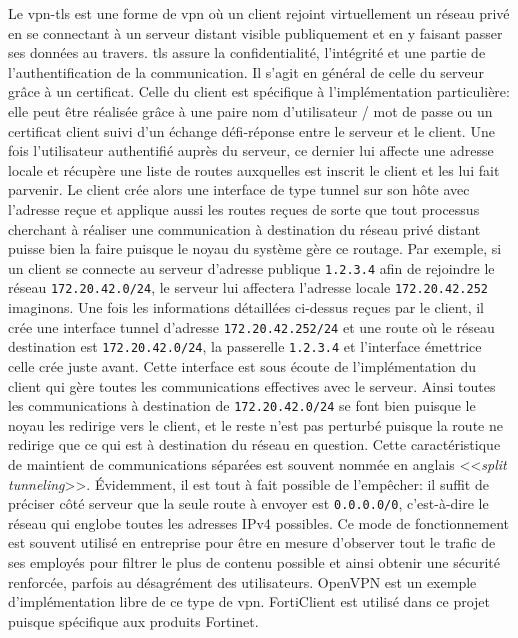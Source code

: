\documentclass[12pt, oneside, a4paper, titlepage]{report}
\begin{document}
Le \gls{vpn-tls} est une forme de \gls{vpn} où un client rejoint virtuellement
un réseau privé en se connectant à un serveur distant visible publiquement et en
y faisant passer ses données au travers. \gls{tls} assure la confidentialité,
l'intégrité et une partie de l'authentification de la communication. Il s'agit
en général de celle du serveur grâce à un certificat. Celle du client est
spécifique à l'implémentation particulière: elle peut être réalisée grâce à une
paire nom d'utilisateur / mot de passe ou un certificat client suivi d'un
échange défi-réponse entre le serveur et le client. Une fois l'utilisateur
authentifié auprès du serveur, ce dernier lui affecte une adresse locale et
récupère une liste de routes auxquelles est inscrit le client et les lui fait
parvenir. Le client crée alors une interface de type tunnel sur son hôte avec
l'adresse reçue et applique aussi les routes reçues de sorte que tout processus
cherchant à réaliser une communication à destination du réseau privé distant
puisse bien la faire puisque le noyau du système gère ce routage. Par exemple,
si un client se connecte au serveur d'adresse publique \texttt{1.2.3.4} afin de
rejoindre le réseau \texttt{172.20.42.0/24}, le serveur lui affectera l'adresse
locale \texttt{172.20.42.252} imaginons. Une fois les informations détaillées
ci-dessus reçues par le client, il crée une interface tunnel d'adresse
\texttt{172.20.42.252/24} et une route où le réseau destination est
\texttt{172.20.42.0/24}, la passerelle \texttt{1.2.3.4} et l'interface émettrice
celle crée juste avant. Cette interface est sous écoute de l'implémentation du
client qui gère toutes les communications effectives avec le serveur. Ainsi
toutes les communications à destination de \texttt{172.20.42.0/24} se font bien
puisque le noyau les redirige vers le client, et le reste n'est pas perturbé
puisque la route ne redirige que ce qui est à destination du réseau en question.
Cette caractéristique de maintient de communications séparées est souvent nommée
en anglais <<\textit{split tunneling}>>.  Évidemment, il est tout à fait
possible de l'empêcher: il suffit de préciser côté serveur que la seule route à
envoyer est \texttt{0.0.0.0/0}, c'est-à-dire le réseau qui englobe toutes les
adresses IPv4 possibles. Ce mode de fonctionnement est souvent utilisé en
entreprise pour être en mesure d'observer tout le trafic de ses employés pour
filtrer le plus de contenu possible et ainsi obtenir une sécurité renforcée,
parfois au désagrément des utilisateurs. OpenVPN est un exemple d'implémentation
libre de ce type de \gls{vpn}. FortiClient est utilisé dans ce projet puisque
spécifique aux produits Fortinet.
\end{document}
